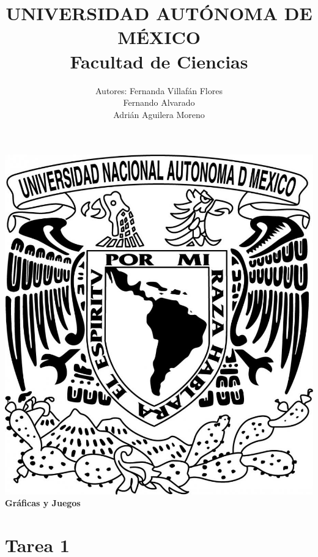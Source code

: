 \documentclass{article}
\begin{document}
\title{UNIVERSIDAD AUTÓNOMA DE MÉXICO\\ Facultad de Ciencias}
\author{Autores:  Fernanda Villafán Flores
  \\ Fernando Alvarado
  \\ Adrián Aguilera Moreno}
\date{}
\maketitle
\begin{center}
\includegraphics[scale=0.20]{./Imagen/Portada.jpg}\\[0.4cm]
\Large
\bf{Gráficas y Juegos}
\normalsize
\end{center}
\newpage
{}
\section*{\LARGE{Tarea 1}}
\end{document}
